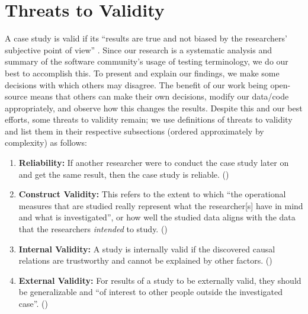 \section{Threats to Validity}\label{threats}

A case study is valid if its ``results are true and not biased by the
researchers' subjective point of view'' \citep[p.~153]{RunesonAndHöst2009}.
Since our research is a systematic analysis and summary of the software
community's usage of testing terminology, we do our
best to accomplish this. To present and explain our findings,
we make some decisions with which others may disagree. The benefit of our work
being open-source means that others can make their own decisions, modify our
data/code appropriately, and observe how this changes the results. Despite this
and our best efforts, some threats to validity remain; we use
 definitions of threats to validity
and list them in their respective subsections (ordered approximately by
complexity) as follows:
\begin{enumerate}
    \item \textbf{Reliability:} If another researcher were to conduct the case
          study later on and get the same result, then the case study is
          reliable. ()
    \item \textbf{Construct Validity:} This refers to the extent to which ``the
          operational measures that are studied really represent what the
          researcher[s] have in mind and what is investigated'', or how well
          the studied data aligns with the data that the researchers
          \emph{intended} to study. ()
    \item \textbf{Internal Validity:} A study is internally valid if the
          discovered causal relations are trustworthy and cannot be explained
          by other factors. %
          ()
    \item \textbf{External Validity:} For results of a study to be externally
          valid, they should be generalizable and ``of interest to other people
          outside the investigated case''. ()
\end{enumerate}


